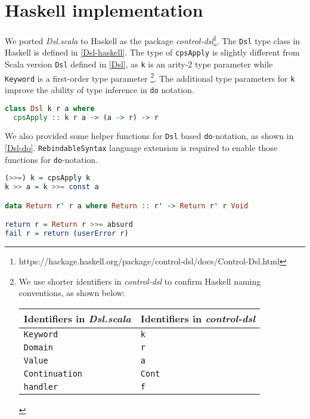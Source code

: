 \section{Haskell implementation}\label{Haskell implementation}

We ported \textit{Dsl.scala} to Haskell as the package \textit{control-dsl}\footnote{https://hackage.haskell.org/package/control-dsl/docs/Control-Dsl.html}. The \lstinline{Dsl} type class in Haskell is defined in \cref{Dsl-haskell}. The type of \lstinline{cpsApply} is slightly different from Scala version \lstinline{Dsl} defined in \cref{Dsl}, as \lstinline{k} is an arity-2 type parameter while \lstinline{Keyword} is a first-order type parameter \footnote{
  We use shorter identifiers in \textit{control-dsl} to confirm Haskell naming conventions, as shown below:
  
  \begin{tabular}{l|l}
    Identifiers in \textit{Dsl.scala} & Identifiers in \textit{control-dsl} \\
    \hline
    \texttt{Keyword} & \texttt{k} \\
    \texttt{Domain} & \texttt{r} \\
    \texttt{Value} & \texttt{a} \\
    \texttt{Continuation} & \texttt{Cont} \\
    \texttt{handler} & \texttt{f} \\
  \end{tabular}
}. The additional type parameters for \lstinline{k} improve the ability of type inference in \lstinline{do} notation.

\begin{lstlisting}[float=htbp,language={Haskell},caption={\lstinline{Dsl} type class in \textit{control-dsl}},label={Dsl-haskell}]
class Dsl k r a where
  cpsApply :: k r a -> (a -> r) -> r
\end{lstlisting}

We also provided some helper functions for \lstinline{Dsl} based \lstinline{do}-notation, as shown in \cref{Dsl-do}. \lstinline{RebindableSyntax} language extension is required to enable those functions for \lstinline{do}-notation.

\begin{lstlisting}[float=htbp,language={Haskell},caption={Helpers for \lstinline{Dsl} based \lstinline{do}-notation},label={Dsl-do}]
(>>=) k = cpsApply k
k >> a = k >>= const a

data Return r' r a where Return :: r' -> Return r' r Void

return r = Return r >>= absurd
fail r = return (userError r)
\end{lstlisting}

